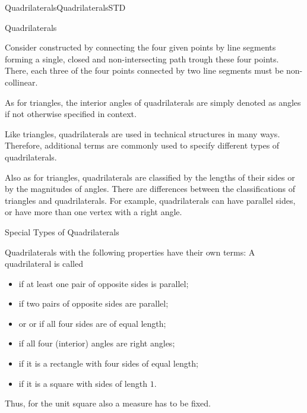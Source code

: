 \begin{MXContent}{Quadrilaterals}{Quadrilaterals}{STD}
\begin{MXInfo}{Quadrilaterals}%

Consider  constructed by connecting the 
four given points by line segments forming a single, closed and 
non-intersecting path trough these four points. There, each three of 
the four points connected by two line segments must be non-collinear. 

As for triangles, the interior angles of quadrilaterals are simply denoted 
as angles if not otherwise specified in context.
\end{MXInfo}

Like triangles, quadrilaterals are used in technical structures in many
ways. Therefore, additional terms are commonly used to specify different types of quadrilaterals. 

Also as for triangles, quadrilaterals are classified by the lengths of their 
sides or by the magnitudes of angles. There are differences between the classifications of triangles and quadrilaterals. For example, quadrilaterals can have parallel sides, or have more than one vertex with a right angle. 

\begin{MXInfo}{Special Types of Quadrilaterals}%

Quadrilaterals with the following properties have their own terms:
A quadrilateral is called

\begin{itemize}
\item {} if at least one pair of opposite sides is parallel;
\item {} if two pairs of opposite sides are parallel;
\item {} or 
  or
  if all four sides are of equal length;
\item {} if all four (interior) angles are right angles;
\item {} if it is a rectangle with four sides  of equal length;
\item {} if it is a square with sides of length $1$.
\end{itemize}
\end{MXInfo}

Thus, for the unit square also a measure has to be fixed.


\end{MXContent}

